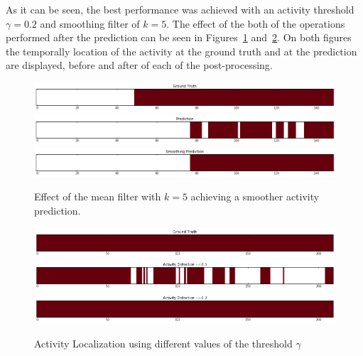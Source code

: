 As it can be seen, the best performance was achieved with an activity threshold $\gamma=0.2$ and smoothing filter of $k=5$. The effect of the both of the operations performed after the prediction can be seen in Figures~\ref{fig:smoothing_effect} and~\ref{fig:activty_threshold_effect}. On both figures the temporally location of the activity at the ground truth and at the prediction are displayed, before and after of each of the post-processing.

\begin{figure}[ht]
\begin{center}
\includegraphics[width=1\linewidth]{img/results/smoothing_effect_4}
\includegraphics[width=1\linewidth]{img/results/smoothing_effect_5}
\includegraphics[width=1\linewidth]{img/results/smoothing_effect_6}
\end{center}
\caption{Effect of the mean filter with $k=5$ achieving a smoother activity prediction.}
\label{fig:smoothing_effect}
\end{figure}

\begin{figure}[ht]
\begin{center}
\includegraphics[width=1\linewidth]{img/results/activity_threshold_effect_1}
\includegraphics[width=1\linewidth]{img/results/activity_threshold_effect_2}
\includegraphics[width=1\linewidth]{img/results/activity_threshold_effect_3}
\end{center}
\caption{Activity Localization using different values of the threshold $\gamma$}
\label{fig:activty_threshold_effect}
\end{figure}

